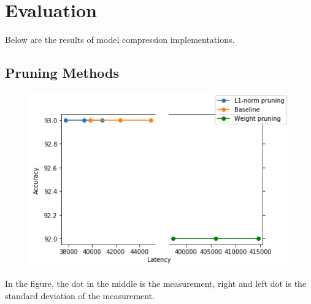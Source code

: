 

    \chapter{Evaluation}
	Below are the results of model compression implementations.
	
	\section{Pruning Methods}
	\begin{figure}
		\centering
		\includegraphics[width=0.7\linewidth]{pruning_result_init}
		\caption{}
		\label{fig:pruning_result_init}
	\end{figure}
	In the figure, the dot in the middle is the measurement, right and left dot is the standard deviation of the measurement.


